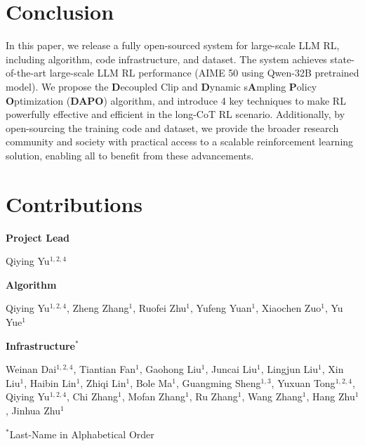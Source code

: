 \section{Conclusion}

In this paper, we release a fully open-sourced system for large-scale LLM RL, including algorithm, code infrastructure, and dataset. The system achieves state-of-the-art large-scale LLM RL performance (AIME 50 using Qwen-32B pretrained model). We propose the \textbf{D}ecoupled Clip and \textbf{D}ynamic s\textbf{A}mpling \textbf{P}olicy \textbf{O}ptimization (\textbf{DAPO}) algorithm, and introduce 4 key techniques to make RL powerfully effective and efficient in the long-CoT RL scenario.
Additionally, by open-sourcing the training code and dataset, we provide the broader research community and society with practical access to a scalable reinforcement learning solution, enabling all to benefit from these advancements. 

\newpage

\section*{Contributions}

\textbf{Project Lead}\quad 

Qiying Yu$^{1,2,4}$


\textbf{Algorithm}

Qiying Yu$^{1,2,4}$, Zheng Zhang$^{1}$, Ruofei Zhu$^{1}$, Yufeng Yuan$^{1}$, Xiaochen Zuo$^{1}$, Yu Yue$^{1}$


\textbf{Infrastructure$^{*}$}

Weinan Dai$^{1,2,4}$, Tiantian Fan$^{1}$, Gaohong Liu$^{1}$, Juncai Liu$^{1}$, Lingjun Liu$^{1}$, Xin Liu$^{1}$, Haibin Lin$^{1}$, Zhiqi Lin$^{1}$, Bole Ma$^{1}$, Guangming Sheng$^{1,3}$, Yuxuan Tong$^{1,2,4}$, Qiying Yu$^{1,2,4}$, Chi Zhang$^{1}$, Mofan Zhang$^{1}$, Ru Zhang$^{1}$, Wang Zhang$^{1}$, Hang Zhu$^{1}$, Jinhua Zhu$^{1}$

$^{*}$Last-Name in Alphabetical Order



